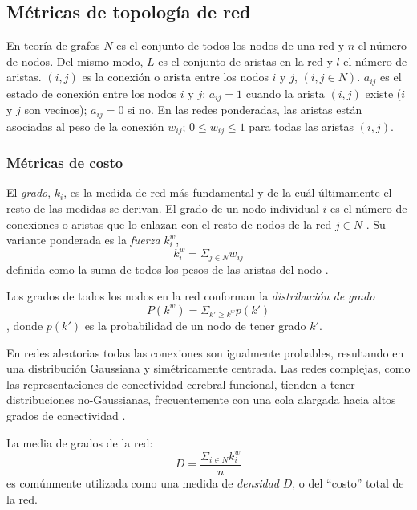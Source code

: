 \subsection{Métricas de topología de red}
En teoría de grafos $N$ es el conjunto de todos los nodos de una red y $n$ el número de nodos.
Del mismo modo, $L$ es el conjunto de aristas en la red y $l$ el número de aristas.
$(i,j)$ es la conexión o arista entre los nodos $i$ y $j$, $(i,j \in N)$.
$a_{ij}$ es el estado de conexión entre los nodos $i$ y $j$: $a_{ij} = 1$ cuando la arista $(i,j)$ existe ($i$ y $j$ son vecinos); $a_{ij} = 0$ si no.
En las redes ponderadas, las aristas están asociadas al peso de la conexión $w_{ij}$; $0 \leq w_{ij} \leq 1$ para todas las aristas $(i, j)$.

\subsubsection{Métricas de costo}
El \emph{grado}, $k_i$, es la medida de red más fundamental y de la cuál últimamente el resto de las medidas se derivan.
El grado de un nodo individual $i$ es el número de conexiones o aristas que lo enlazan con el resto de nodos de la red $j \in N$ \parencite{Bullmore2009a,Rubinov2010}.
Su variante ponderada es la \emph{fuerza} $k_i^w$,
\begin{equation}\label{eqStrength}
    k_i^w = \Sigma_{j \in N}w_{ij}
\end{equation}
definida como la suma de todos los pesos de las aristas del nodo \parencite{Rubinov2010}.\par
Los grados de todos los nodos en la red conforman la \emph{distribución de grado} \parencite{Rubinov2010}
\begin{equation}\label{eqDDist}
    P(k^w)=\Sigma_{k' \geq k^w}p(k')
\end{equation}, donde $p(k')$ es la probabilidad de un nodo de tener grado $k'$.\par
En redes aleatorias todas las conexiones son igualmente probables, resultando en una distribución Gaussiana y simétricamente centrada.
Las redes complejas, como las representaciones de conectividad cerebral funcional, tienden a tener distribuciones no-Gaussianas, frecuentemente con una cola alargada hacia altos grados de conectividad \parencite{Bullmore2009a}. \par
La media de grados de la red:
\begin{equation}\label{eqDensity}
    D=\frac{\Sigma_{i \in N}k_i^w}{n}
\end{equation}
es comúnmente utilizada como una medida de \emph{densidad} $D$, o del ``costo'' total de la red.

